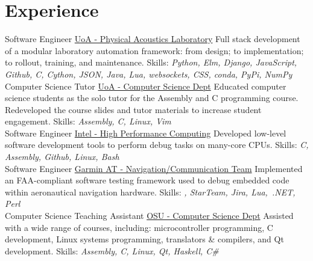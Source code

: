 \documentclass[a4paper]{twentysecondcv}
\begin{document}
\makeprofile{}

\section{Experience}
\begin{twenty}
           {}
           {Software Engineer}
           {\href{https://pal.auckland.ac.nz/}{UoA - Physical Acoustics Laboratory}}
           {}
           {Full stack development of a modular laboratory automation
           framework: from design; to implementation; to rollout, training, and
           maintenance.
           Skills: \emph{Python, Elm, Django, JavaScript, Github, C, Cython, JSON,
           Java, Lua, websockets, CSS, conda, PyPi, NumPy}} \\

           {}
           {Computer Science Tutor}
           {\href{http://www.auckland.ac.nz/}{UoA - Computer Science Dept}}
           {}
           {Educated computer science students as the solo tutor for the
           Assembly and C programming course. Redeveloped the course slides and
           tutor materials to increase student engagement.
           Skills: \emph{Assembly, C, Linux, Vim}} \\

           {}
           {Software Engineer}
           {\href{https://www.intel.com}{Intel - High Performance Computing}}
           {}
           {Developed low-level software development tools to perform debug
           tasks on many-core CPUs.
           Skills: \emph{C, Assembly, Github, Linux, Bash}} \\

           {}
           {Software Engineer}
           {\href{http://www.garmin.com}{Garmin AT - Navigation/Communication Team}}
           {}
           {Implemented an FAA-compliant software testing framework used to
           debug embedded code within aeronautical navigation hardware.
           Skills: \emph{\CC, StarTeam, Jira, Lua,~.NET, Perl}} \\

           {}
           {Computer Science Teaching Assistant}
           {\href{http://www.oregonstate.edu/}{OSU - Computer Science Dept}}
           {}
           {Assisted with a wide range of courses, including: microcontroller
           programming, C development, Linux systems programming, translators
           \& compilers, and Qt development.
           Skills: \emph{Assembly, C, Linux, Qt, Haskell, C\#}} \\


\end{twenty}
\end{document}
